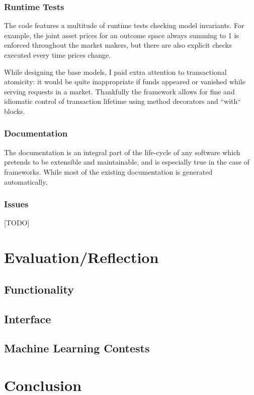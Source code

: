 \documentclass[bsc,frontabs,twoside,singlespacing,parskip,deptreport]{infthesis}     %
\begin{document}
\subsection{Runtime Tests}
    
    The code features a multitude of runtime tests checking model invariants. For example, the joint asset prices for an outcome space always summing to 1 is enforced throughout the market makers, but there are also explicit checks executed every time prices change.

    While designing the base models, I paid extra attention to transactional atomicity: it would be quite inappropriate if funds appeared or vanished while serving requests in a market. Thankfully the framework allows for fine and idiomatic control of transaction lifetime using method decorators and ``with`` blocks.

\subsection{Documentation}

    The documentation is an integral part of the life-cycle of any software which pretends to be extensible and maintainable, and is especially true in the case of frameworks. While most of the existing documentation is generated automatically, 
    
\subsection{Issues}
    [TODO]
    
\chapter{Evaluation/Reflection}

\section{Functionality}

\section{Interface}

\section{Machine Learning Contests}

\chapter{Conclusion}






\end{document}
